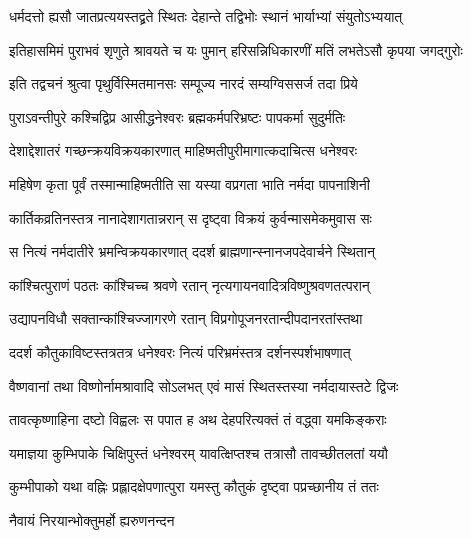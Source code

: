\twolineshloka
{धर्मदत्तो ह्यसौ जातप्रत्ययस्तद्व्रते स्थितः}
{देहान्ते तद्विभोः स्थानं भार्याभ्यां संयुतोऽभ्ययात्} %

\twolineshloka
{इतिहासमिमं पुराभवं शृणुते श्रावयते च यः पुमान्}
{हरिसन्निधिकारणीं मतिं लभतेऽसौ कृपया जगद्गुरोः} %





\twolineshloka
{इति तद्वचनं श्रुत्वा पृथुर्विस्मितमानसः}
{सम्पूज्य नारदं सम्यग्विससर्ज तदा प्रिये} %

\twolineshloka
{पुराऽवन्तीपुरे कश्चिद्विप्र आसीद्धनेश्वरः}
{ब्रह्मकर्मपरिभ्रष्टः पापकर्मा सुदुर्मतिः} %

\twolineshloka
{देशाद्देशातरं गच्छन्क्रयविक्रयकारणात्}
{माहिष्मतीपुरीमागात्कदाचित्स धनेश्वरः} %

\twolineshloka
{महिषेण कृता पूर्वं तस्मान्माहिष्मतीति सा}
{यस्या वप्रगता भाति नर्मदा पापनाशिनी} %

\twolineshloka
{कार्तिकव्रतिनस्तत्र नानादेशागतान्नरान्}
{स दृष्ट्वा विक्रयं कुर्वन्मासमेकमुवास सः} %

\twolineshloka
{स नित्यं नर्मदातीरे भ्रमन्विक्रयकारणात्}
{ददर्श ब्राह्मणान्स्नानजपदेवार्चने स्थितान्} %

\twolineshloka
{कांश्चित्पुराणं पठतः कांश्चिच्च श्रवणे रतान्}
{नृत्यगायनवादित्रविष्णुश्रवणतत्परान्} %

\twolineshloka
{उद्यापनविधौ सक्तान्कांश्चिज्जागरणे रतान्}
{विप्रगोपूजनरतान्दीपदानरतांस्तथा} %

\twolineshloka
{ददर्श कौतुकाविष्टस्तत्रतत्र धनेश्वरः}
{नित्यं परिभ्रमंस्तत्र दर्शनस्पर्शभाषणात्} %

\twolineshloka
{वैष्णवानां तथा विष्णोर्नामश्रावादि सोऽलभत्}
{एवं मासं स्थितस्तस्या नर्मदायास्तटे द्विजः} %

\twolineshloka
{तावत्कृष्णाहिना दष्टो विह्वलः स पपात ह}
{अथ देहपरित्यक्तं तं वद्ध्वा यमकिङ्कराः} %

\twolineshloka
{यमाज्ञया कुम्भिपाके चिक्षिपुस्तं धनेश्वरम्}
{यावत्क्षिप्तश्च तत्रासौ तावच्छीतलतां ययौ} %

\twolineshloka
{कुम्भीपाको यथा वह्निः प्रह्लादक्षेपणात्पुरा}
{यमस्तु कौतुकं दृष्ट्वा पप्रच्छानीय तं ततः} %




\onelineshloka
{नैवायं निरयान्भोक्तुमर्हो ह्यरुणनन्दन} %


